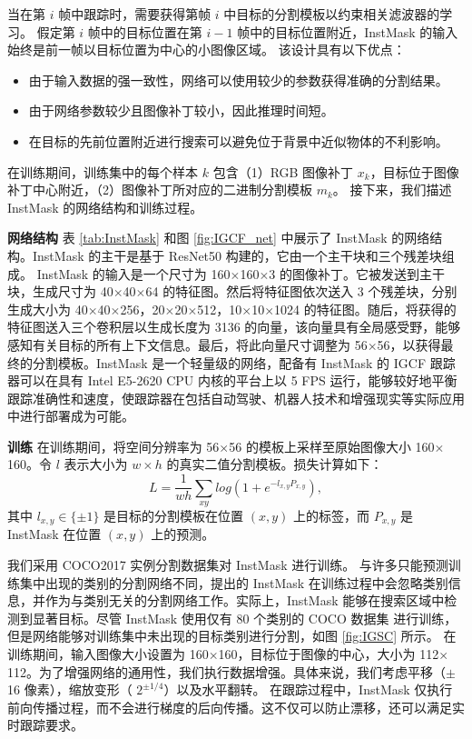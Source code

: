当在第 $i$ 帧中跟踪时，需要获得第帧 $i$ 中目标的分割模板以约束相关滤波器的学习。
假定第 $i$ 帧中的目标位置在第 $i-1$ 帧中的目标位置附近，InstMask 的输入始终是前一帧以目标位置为中心的小图像区域。
该设计具有以下优点：

\begin{itemize}
\item 由于输入数据的强一致性，网络可以使用较少的参数获得准确的分割结果。
\item 由于网络参数较少且图像补丁较小，因此推理时间短。
\item 在目标的先前位置附近进行搜索可以避免位于背景中近似物体的不利影响。
\end{itemize}

在训练期间，训练集中的每个样本 $k$ 包含（1）RGB 图像补丁 $x_k$，目标位于图像补丁中心附近，（2）图像补丁所对应的二进制分割模板 $m_{k}$。
接下来，我们描述 InstMask 的网络结构和训练过程。

\textbf{网络结构} 表 \ref{tab:InstMask} 和图 \ref{fig:IGCF_net} 中展示了 InstMask 的网络结构。InstMask 的主干是基于 ResNet50 \cite{He2016DeepRL} 构建的，它由一个主干块和三个残差块组成。
InstMask 的输入是一个尺寸为 160$\times$160$\times$3 的图像补丁。它被发送到主干块，生成尺寸为 40$\times$40$\times$64 的特征图。然后将特征图依次送入 3 个残差块，分别生成大小为 40$\times$40$\times$256，20$\times$20$\times$512，10$\times$10$\times$1024 的特征图。随后，将获得的特征图送入三个卷积层以生成长度为 3136 的向量，该向量具有全局感受野，能够感知有关目标的所有上下文信息。最后，将此向量尺寸调整为 56$\times$56，以获得最终的分割模板。InstMask 是一个轻量级的网络，配备有 InstMask 的 IGCF 跟踪器可以在具有 Intel E5-2620 CPU 内核的平台上以 5 FPS 运行，能够较好地平衡跟踪准确性和速度，使跟踪器在包括自动驾驶、机器人技术和增强现实等实际应用中进行部署成为可能。

\textbf{训练} 在训练期间，将空间分辨率为 56$\times$56 的模板上采样至原始图像大小 160$\times$160。令 $l$ 表示大小为 $w \times h$ 的真实二值分割模板。损失计算如下：
\begin{equation}
L = \frac{1}{wh} \sum_{xy}{log(1+e^{-l_{x,y}P_{x,y}})},
\end{equation}
其中 $l_{x,y} \in \{ \pm 1 \}$ 是目标的分割模板在位置 $(x,y)$ 上的标签，而 $P_{x,y}$ 是 InstMask 在位置 $(x,y)$ 上的预测。

我们采用 COCO2017 \cite{COCO} 实例分割数据集对 InstMask 进行训练。
与许多只能预测训练集中出现的类别的分割网络不同，提出的 InstMask 在训练过程中会忽略类别信息，并作为与类别无关的分割网络工作。实际上，InstMask 能够在搜索区域中检测到显著目标。尽管 InstMask 使用仅有 80 个类别的 COCO 数据集 \cite{COCO} 进行训练，但是网络能够对训练集中未出现的目标类别进行分割，如图 \ref{fig:IGSC} 所示。
在训练期间，输入图像大小设置为 160$\times$160，目标位于图像的中心，大小为 112$\times$112。为了增强网络的通用性，我们执行数据增强。具体来说，我们考虑平移（$\pm$16 像素），缩放变形（ $2^{\pm 1/4}$）以及水平翻转。
在跟踪过程中，InstMask 仅执行前向传播过程，而不会进行梯度的后向传播。这不仅可以防止漂移，还可以满足实时跟踪要求。

